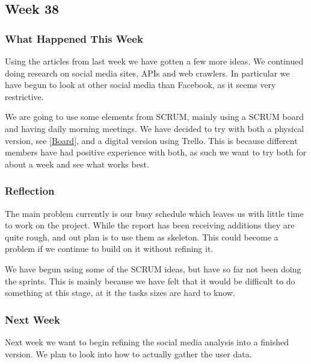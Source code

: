 \subsection{Week 38} 
\subsubsection{What Happened This Week} 
Using the articles from last week we have gotten a few more ideas. We continued
doing research on social media sites, APIs and web crawlers. In particular we
have begun to look at other social media than Facebook, as it seems very
restrictive.\nl

We are going to use some elements from SCRUM, mainly using a SCRUM board and
having daily morning meetings. We have decided to try with both a physical
version, see \autoref{Board}, and a digital version using Trello. This is
because different members have had positive experience with both, as such we
want to try both for about a week and see what works best. 


\subsubsection{Reflection}
The main problem currently is our busy schedule which leaves us with little time
to work on the project. While the report has been receiving additions they are
quite rough, and out plan is to use them as skeleton. This could become a
problem if we continue to build on it without refining it.\nl

We have begun using some of the SCRUM ideas, but have so far not been doing the
sprints. This is mainly because we have felt that it would be difficult to do
something at this stage, at it the tasks sizes are hard to know.

\subsubsection{Next Week}
Next week we want to begin refining the social media analysis into a finished
version. We plan to look into how to actually gather the user data.






